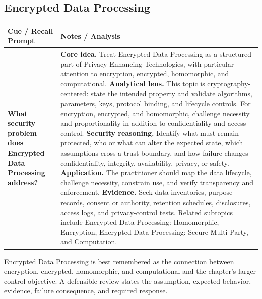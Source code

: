 \documentclass[11pt]{article}
\newcommand{\CornellHeader}{%
\rowcolor{Navy}\color{white}\bfseries Cue / Recall Prompt & \color{white}\bfseries Notes / Analysis\\\hline}
\newcommand{\CornellRow}[2]{%
\cellcolor{CueGray}\RaggedRight\textbf{#1} & \RaggedRight #2\\\hline}
\begin{document}
\subsection*{Encrypted Data Processing}
\begin{longtable}{>{\RaggedRight\arraybackslash}p{}|>{\RaggedRight\arraybackslash}p{}}
\CornellHeader
\CornellRow{What security problem does Encrypted Data Processing address?}{\textbf{Core idea.} Treat Encrypted Data Processing as a structured part of Privacy-Enhancing Technologies, with particular attention to encryption, encrypted, homomorphic, and computational. \textbf{Analytical lens.} This topic is cryptography-centered: state the intended property and validate algorithms, parameters, keys, protocol binding, and lifecycle controls. For encryption, encrypted, and homomorphic, challenge necessity and proportionality in addition to confidentiality and access control. \textbf{Security reasoning.} Identify what must remain protected, who or what can alter the expected state, which assumptions cross a trust boundary, and how failure changes confidentiality, integrity, availability, privacy, or safety. \textbf{Application.} The practitioner should map the data lifecycle, challenge necessity, constrain use, and verify transparency and enforcement. \textbf{Evidence.} Seek data inventories, purpose records, consent or authority, retention schedules, disclosures, access logs, and privacy-control tests. Related subtopics include Encrypted Data Processing: Homomorphic, Encryption, Encrypted Data Processing: Secure Multi-Party, and Computation.}
\end{longtable}
\begin{topicsummary}
Encrypted Data Processing is best remembered as the connection between encryption, encrypted, homomorphic, and computational and the chapter's larger control objective. A defensible review states the assumption, expected behavior, evidence, failure consequence, and required response.
\end{topicsummary}
\end{document}
